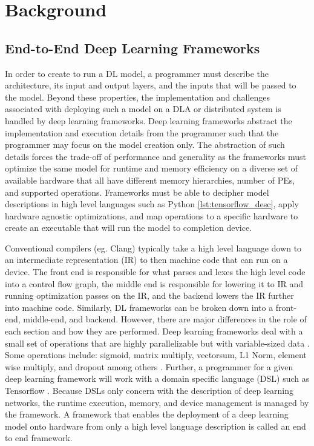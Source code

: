 
\chapter{Background} %

\label{Chapter2} %

\section{End-to-End Deep Learning Frameworks}

In order to create to run a DL model, a programmer must describe the
architecture, its input and output layers, and the inputs that will be passed
to the model. Beyond these properties, the implementation and challenges
associated with deploying such a model on a DLA or distributed system is
handled by deep learning frameworks. Deep learning frameworks abstract the
implementation and execution details from the programmer such that the
programmer may focus on the model creation only. The abstraction of such
details forces the trade-off of performance and generality as the frameworks
must optimize the same model for runtime and memory efficiency on a diverse set
of available hardware that all have different memory hierarchies, number of PEs,
and supported operations. Frameworks must be able to decipher model
descriptions in high level languages such as Python \ref{lst:tensorflow_desc}, apply hardware agnostic
optimizations, and map operations to a specific hardware to create an executable
that will run the model to completion device.

Conventional compilers (eg. Clang) typically take a high level language down to
an intermediate representation (IR) to then machine code that can run on a
device.  The front end is responsible for what parses and lexes the high level
code into a control flow graph, the middle end is responsible for lowering it
to IR and running optimization passes on the IR, and the backend lowers the IR
further into machine code. Similarly, DL frameworks can be broken down into a
front-end, middle-end, and backend. However, there are major differences in the
role of each section and how they are performed.  Deep learning frameworks
deal with a small set of operations that are highly parallelizable but with
variable-sized data \cite{nGraph}. Some operations include: sigmoid, matrix
multiply, vectorsum, L1 Norm, element wise multiply, and dropout among others
\cite{cntk}. Further, a programmer for a given deep learning framework will
work with a domain specific language (DSL) such as Tensorflow
\cite{tensorflow}. Because DSLs only concern with the description of deep
learning networks, the runtime execution, memory, and device management is
managed by the framework. A framework that enables the deployment of a deep
learning model onto hardware from only a high level language description is
called an end to end framework.


